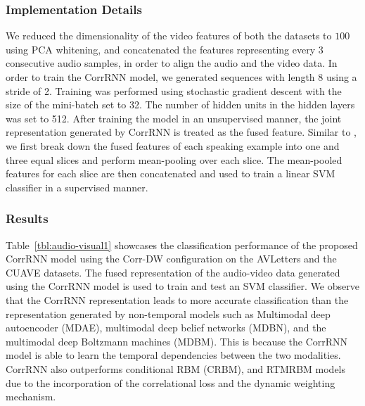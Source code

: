 \documentclass[10pt,twocolumn,letterpaper]{article}
\begin{document}
\subsubsection{Implementation Details}
We reduced the dimensionality of the video features of both the datasets to $100$ using PCA whitening, and concatenated the features representing every $3$ consecutive audio samples, in order to align the audio and the video data. 
%
%
%
%
%
In order to train the CorrRNN model, we generated sequences with length 8 using a stride of 2. Training was performed using stochastic gradient descent with the size of the mini-batch set to 32. The number of hidden units in the hidden layers was set to 512. %
After training the model in an unsupervised manner, the joint representation generated by CorrRNN is treated as the fused feature. Similar to \cite{hu2016temporal}, we first break down the fused features of each speaking example into one and three equal slices and perform mean-pooling over each slice. The  mean-pooled features for each slice are then concatenated and used to train a linear SVM classifier in a supervised manner.

\subsubsection{Results}
Table~\ref{tbl:audio-visual1} showcases the classification performance of the proposed CorrRNN model using the Corr-DW configuration on the AVLetters and the CUAVE datasets. The fused representation of the audio-video data generated using the CorrRNN model is used to train and test an SVM classifier. We observe that the CorrRNN representation leads to more accurate classification than the representation generated by non-temporal models such as Multimodal deep autoencoder (MDAE), multimodal deep belief networks (MDBN), and the multimodal deep Boltzmann machines (MDBM). This is because the CorrRNN model is able to learn the temporal dependencies between the two modalities. CorrRNN also outperforms conditional RBM (CRBM), and RTMRBM models due to the incorporation of the correlational loss and the dynamic weighting mechanism. 
\end{document}
